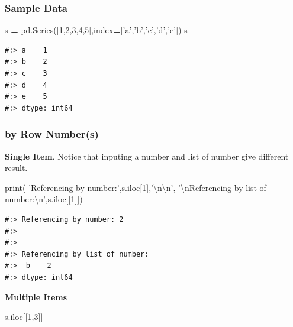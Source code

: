 \documentclass[
]{book}
\newenvironment{Shaded}{\begin{snugshade}}{\end{snugshade}}
\newcommand{\BuiltInTok}[1]{#1}
\newcommand{\CharTok}[1]{\textcolor[rgb]{0.5,0.5,0.5}{#1}}
\newcommand{\DecValTok}[1]{\textcolor[rgb]{0.06,0.06,0.06}{#1}}
\newcommand{\NormalTok}[1]{#1}
\newcommand{\OperatorTok}[1]{\textcolor[rgb]{0.43,0.43,0.43}{\textbf{#1}}}
\newcommand{\StringTok}[1]{\textcolor[rgb]{0.5,0.5,0.5}{#1}}
\begin{document}
\hypertarget{sample-data-4}{%
\subsubsection{Sample Data}\label{sample-data-4}}

\begin{Shaded}
\begin{Highlighting}[]
\NormalTok{s }\OperatorTok{=}\NormalTok{ pd.Series([}\DecValTok{1}\NormalTok{,}\DecValTok{2}\NormalTok{,}\DecValTok{3}\NormalTok{,}\DecValTok{4}\NormalTok{,}\DecValTok{5}\NormalTok{],index}\OperatorTok{=}\NormalTok{[}\StringTok{'a'}\NormalTok{,}\StringTok{'b'}\NormalTok{,}\StringTok{'c'}\NormalTok{,}\StringTok{'d'}\NormalTok{,}\StringTok{'e'}\NormalTok{]) }
\NormalTok{s}
\end{Highlighting}
\end{Shaded}

\begin{verbatim}
#:> a    1
#:> b    2
#:> c    3
#:> d    4
#:> e    5
#:> dtype: int64
\end{verbatim}

\hypertarget{by-row-numbers}{%
\subsubsection{by Row Number(s)}\label{by-row-numbers}}

\textbf{Single Item}. Notice that inputing a number and list of number give different result.

\begin{Shaded}
\begin{Highlighting}[]
\BuiltInTok{print}\NormalTok{( }\StringTok{'Referencing by number:'}\NormalTok{,s.iloc[}\DecValTok{1}\NormalTok{],}\StringTok{'}\CharTok{\textbackslash{}n\textbackslash{}n}\StringTok{'}\NormalTok{,}
       \StringTok{'}\CharTok{\textbackslash{}n}\StringTok{Referencing by list of number:}\CharTok{\textbackslash{}n}\StringTok{'}\NormalTok{,s.iloc[[}\DecValTok{1}\NormalTok{]])}
\end{Highlighting}
\end{Shaded}

\begin{verbatim}
#:> Referencing by number: 2 
#:> 
#:>  
#:> Referencing by list of number:
#:>  b    2
#:> dtype: int64
\end{verbatim}

\textbf{Multiple Items}

\begin{Shaded}
\begin{Highlighting}[]
\NormalTok{s.iloc[[}\DecValTok{1}\NormalTok{,}\DecValTok{3}\NormalTok{]] }
\end{Highlighting}
\end{Shaded}
\end{document}

